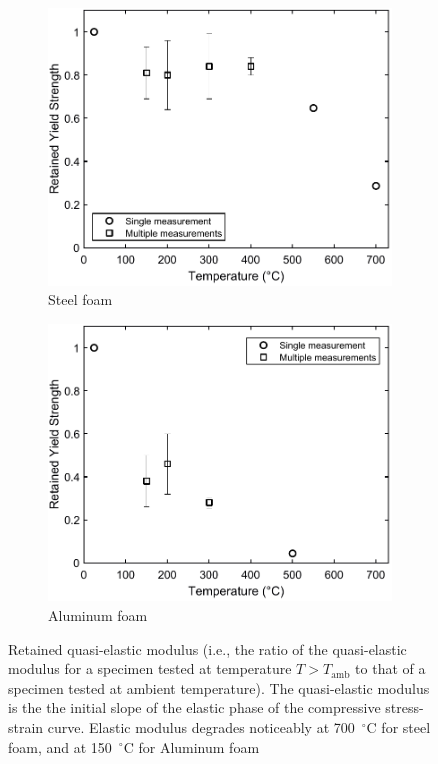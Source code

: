 \documentclass[review]{elsarticle}
\begin{document}
\begin{figure}
	\centering
	\begin{subfigure}{.5\textwidth}
		\centering
		\includegraphics[width=0.95\linewidth]
		{Tex-Figures/Fig13a-yield_stress.pdf}
		\caption{Steel foam}
		\label{fig3:sub1}
	\end{subfigure}%
	\begin{subfigure}{.5\textwidth}
		\centering
		\includegraphics[width=0.95\linewidth]
		{Tex-Figures/Fig13b-yield_stress.pdf}
		\caption{Aluminum foam}
		\label{fig3:sub2}
	\end{subfigure}
	\caption{Retained quasi-elastic modulus (i.e., the ratio of the quasi-elastic modulus for a specimen tested at temperature $T>T_\text{amb}$ to that of a specimen tested at ambient temperature). The quasi-elastic modulus is the the initial slope of the elastic phase of the compressive stress-strain curve. Elastic modulus degrades noticeably at 700~$^{\circ}\mathrm{C}$ for steel foam, and at 150~$^{\circ}\mathrm{C}$ for Aluminum foam}
	\label{Quasi-elastic_modulus}
\end{figure}
\end{document}
